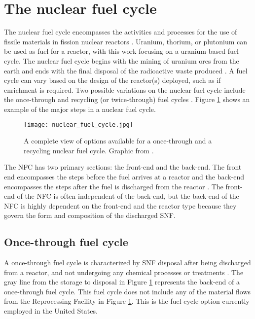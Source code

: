 %
%
%
\section{The nuclear fuel cycle}
The nuclear fuel cycle encompasses the activities and processes 
for the use of fissile materials in fission nuclear reactors \cite{tsoulfanidis_nuclear_2013}. 
Uranium, thorium, or plutonium can be used as 
fuel for a reactor, with  this work focusing on a uranium-based 
fuel cycle. The nuclear fuel cycle begins with the mining of uranium ores 
from the earth and ends with the final disposal of the radioactive 
waste produced 
\cite{tsoulfanidis_nuclear_2013}. A fuel cycle can vary based on the
design of the reactor(s) deployed, such as if enrichment is required.  
Two possible variations on the nuclear fuel cycle 
include the once-through and recycling (or twice-through) fuel cycles 
\cite{tsoulfanidis_nuclear_2013}. Figure \ref{fig:fuel_cycle} shows 
an example of the major steps in a nuclear fuel cycle. 

\begin{figure}
    \centering
    \texttt{[image: nuclear\_fuel\_cycle.jpg]}
    \caption{A complete view of options available for a once-through and 
    a recycling nuclear 
    fuel cycle. Graphic from \protect\cite{us_nuclear_regulatory_commission_stages_2020}.}
    \label{fig:fuel_cycle}
\end{figure}

The \gls{NFC} has two primary sections: the front-end and 
the back-end. 
The front end encompasses the steps before the fuel arrives at a reactor 
and the back-end encompasses the steps after the fuel is discharged 
from the reactor \cite{rodriguez-penalonga_review_2017}. The front-end of 
the \gls{NFC} is often independent of the back-end, but the back-end 
of the \gls{NFC} is highly dependent on the front-end and the reactor 
type because they govern the form and composition of the discharged 
\gls{SNF}. 

\subsection{Once-through fuel cycle}
A once-through fuel cycle is characterized by \gls{SNF} disposal
after being discharged from a reactor, and not undergoing any chemical processes 
or treatments \cite{rodriguez-penalonga_review_2017}. The gray line from 
the storage to disposal in Figure \ref{fig:fuel_cycle} represents 
the back-end of a once-through fuel cycle. This fuel cycle does 
not include any of the material flows from the Reprocessing Facility in 
Figure \ref{fig:fuel_cycle}.
This is the fuel cycle option currently employed in the 
United States. 


